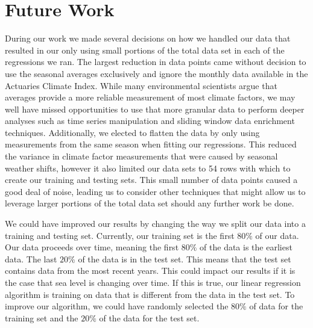 \documentclass[12pt]{report}
\begin{document}
\section* {Future Work}
\indent \par During our work we made several decisions on how we handled our data that resulted in our only using small portions of the total data set in each of the regressions we ran. The largest reduction in data points came without decision to use the seasonal averages exclusively and ignore the monthly data available in the Actuaries Climate Index. While many environmental scientists argue that averages provide a more reliable measurement of most climate factors, we may well have missed opportunities to use that more granular data to perform deeper analyses such as time series manipulation and sliding window data enrichment techniques. Additionally, we elected to flatten the data by only using measurements from the same season when fitting our regressions. This reduced the variance in climate factor measurements that were caused by seasonal weather shifts, however it also limited our data sets to 54 rows with which to create our training and testing sets. This small number of data points caused a good deal of noise, leading us to consider other techniques that might allow us to leverage larger portions of the total data set should any further work be done.
\par We could have improved our results by changing the way we split our data into a training and testing set. Currently, our training set is the first $80\%$ of our data. Our data proceeds over time, meaning the first $80\%$ of the data is the earliest data. The last $20\%$ of the data is in the test set. This means that the test set contains data from the most recent years. This could impact our results if it is the case that sea level is changing over time. If this is true, our linear regression algorithm is training on data that is different from the data in the test set. To improve our algorithm, we could have randomly selected the $80\%$ of data for the training set and the $20\%$ of the data for the test set.
\end{document}
